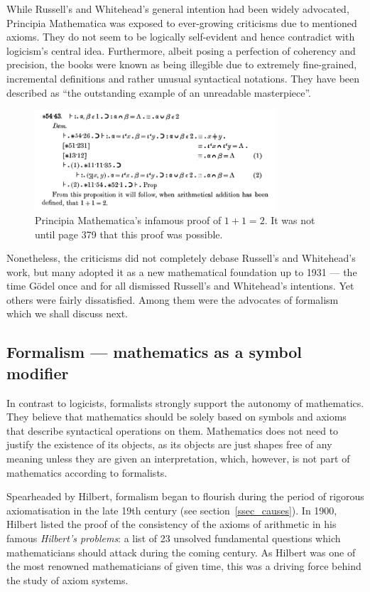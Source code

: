\documentclass[hidelinks]{article}
\begin{document}
While Russell's and Whitehead's general intention had been widely advocated, Principia Mathematica was exposed to ever-growing criticisms due to mentioned axioms. They do not seem to be logically self-evident and hence contradict with logicism's central idea. Furthermore, albeit posing a perfection of coherency and precision, the books were known as being illegible due to extremely fine-grained, incremental definitions and rather unusual syntactical notations. They have been described as ``the outstanding example of an unreadable masterpiece''\cite[p.~154]{math_experience}.

\begin{figure}[h]
	\centering
	\includegraphics[width=0.8\textwidth]{img/principia_mathematica.png}
	\caption{Principia Mathematica's infamous proof of $1+1=2$. It was not until page 379 that this proof was possible.}
\end{figure}

Nonetheless, the criticisms did not completely debase Russell's and Whitehead's work, but many adopted it as a new mathematical foundation up to 1931 --- the time Gödel once and for all dismissed Russell's and Whitehead's intentions. Yet others were fairly dissatisfied. Among them were the advocates of formalism which we shall discuss next.

\subsection{Formalism --- mathematics as a symbol modifier}\label{ssec_formalism}
In contrast to logicists, formalists strongly support the autonomy of mathematics. 
They believe that mathematics should be solely based on symbols and axioms that describe syntactical operations on them. Mathematics does not need to justify the existence of its objects, as its objects are just shapes free of any meaning unless they are given an interpretation, which, however, is not part of mathematics according to formalists.

Spearheaded by Hilbert, formalism began to flourish during the period of rigorous axiomatisation in the late 19th century (see section~\ref{ssec_causes}). 
In 1900, Hilbert listed the proof of the consistency of the axioms of arithmetic in his famous \textit{Hilbert's problems}: a list of 23 unsolved fundamental questions which mathematicians should attack during the coming century. As Hilbert was one of the most renowned mathematicians of given time, this was a driving force behind the study of axiom systems.
\end{document}
